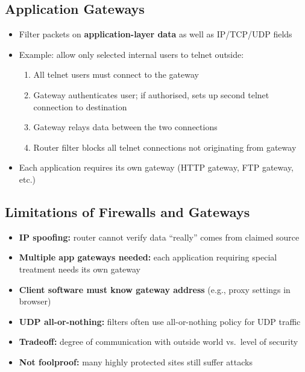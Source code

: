 \subsection{Application Gateways}

\begin{tcolorbox}[keybox, title=Application Gateways]
\begin{itemize}[noitemsep]
  \item Filter packets on \textbf{application-layer data} as well as IP/TCP/UDP fields
  \item Example: allow only selected internal users to telnet outside:
    \begin{enumerate}[noitemsep]
      \item All telnet users must connect to the gateway
      \item Gateway authenticates user; if authorised, sets up second telnet connection to destination
      \item Gateway relays data between the two connections
      \item Router filter blocks all telnet connections not originating from gateway
    \end{enumerate}
  \item Each application requires its own gateway (HTTP gateway, FTP gateway, etc.)
\end{itemize}
\end{tcolorbox}

\begin{imagebox}
\end{imagebox}

\subsection{Limitations of Firewalls and Gateways}

\begin{tcolorbox}[warnbox, title=Firewall Limitations]
\begin{itemize}[noitemsep]
  \item \textbf{IP spoofing:} router cannot verify data ``really'' comes from claimed source
  \item \textbf{Multiple app gateways needed:} each application requiring special treatment needs its own gateway
  \item \textbf{Client software must know gateway address} (e.g., proxy settings in browser)
  \item \textbf{UDP all-or-nothing:} filters often use all-or-nothing policy for UDP traffic
  \item \textbf{Tradeoff:} degree of communication with outside world vs.\ level of security
  \item \textbf{Not foolproof:} many highly protected sites still suffer attacks
\end{itemize}
\end{tcolorbox}

